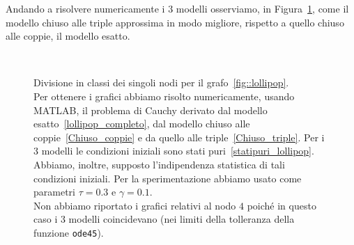 Andando a risolvere numericamente i $3$ modelli osserviamo, in Figura~\ref{fig::confronto_modelli}, come il modello chiuso alle triple approssima in modo migliore, rispetto a quello chiuso alle coppie, il modello esatto.
\begin{figure}[!htb]
	\centering
{}
\\
\end{figure}
\begin{figure}
\ContinuedFloat
{}
\caption[Confronto tra il modello esatto, chiuso alle coppie e alle triple per il grafo~\ref{fig::lollipop}]
{Divisione in classi dei singoli nodi per il grafo~\ref{fig::lollipop}.\\
Per ottenere i grafici abbiamo risolto numericamente,  usando MATLAB, il problema di Cauchy derivato dal modello esatto~\eqref{lollipop_completo},  dal modello chiuso alle coppie~\eqref{Chiuso_coppie} e da quello alle triple~\eqref{Chiuso_triple}.
Per i $3$ modelli le condizioni iniziali sono stati puri~\eqref{statipuri_lollipop}. Abbiamo, inoltre,  supposto l'indipendenza statistica di tali condizioni iniziali.
Per la sperimentazione abbiamo usato come parametri $\tau = 0.3$ e $\gamma = 0.1$.\\
Non abbiamo riportato i grafici relativi al nodo $4$ poich\'e in questo caso i 3 modelli coincidevano (nei limiti della tolleranza della funzione \texttt{ode45}).}
\label{fig::confronto_modelli}
\end{figure}

